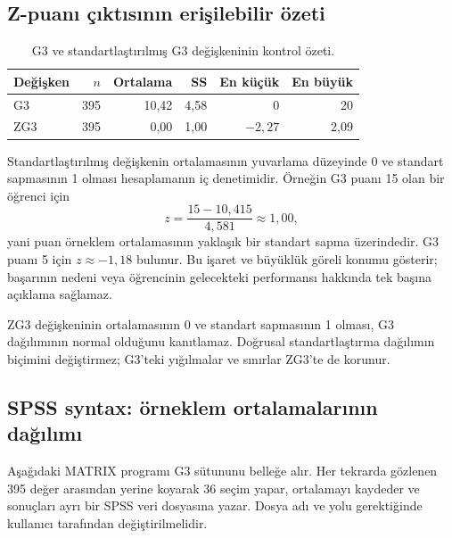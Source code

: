 \subsection{Z-puanı çıktısının erişilebilir özeti}

\begin{table}[htbp]
\centering
\caption{G3 ve standartlaştırılmış G3 değişkeninin kontrol özeti.}
\begin{tabular}{@{}lrrrrr@{}}
\toprule
Değişken & $n$ & Ortalama & SS & En küçük & En büyük \\
\midrule
G3 & 395 & 10,42 & 4,58 & 0 & 20 \\
ZG3 & 395 & 0,00 & 1,00 & $-2,27$ & 2,09 \\
\bottomrule
\end{tabular}
\end{table}

Standartlaştırılmış değişkenin ortalamasının yuvarlama düzeyinde 0 ve standart
sapmasının 1 olması hesaplamanın iç denetimidir. Örneğin G3 puanı 15 olan bir
öğrenci için
\[
z=\frac{15-10{,}415}{4{,}581}\approx1{,}00,
\]
yani puan örneklem ortalamasının yaklaşık bir standart sapma üzerindedir.
G3 puanı 5 için $z\approx-1{,}18$ bulunur. Bu işaret ve büyüklük göreli konumu
gösterir; başarının nedeni veya öğrencinin gelecekteki performansı hakkında
tek başına açıklama sağlamaz.

\begin{mistakebox}
ZG3 değişkeninin ortalamasının 0 ve standart sapmasının 1 olması, G3
dağılımının normal olduğunu kanıtlamaz. Doğrusal standartlaştırma dağılımın
biçimini değiştirmez; G3'teki yığılmalar ve sınırlar ZG3'te de korunur.
\end{mistakebox}

\subsection{SPSS syntax: örneklem ortalamalarının dağılımı}

Aşağıdaki MATRIX programı G3 sütununu belleğe alır. Her tekrarda gözlenen 395
değer arasından yerine koyarak 36 seçim yapar, ortalamayı kaydeder ve sonuçları
ayrı bir SPSS veri dosyasına yazar. Dosya adı ve yolu gerektiğinde kullanıcı
tarafından değiştirilmelidir.

